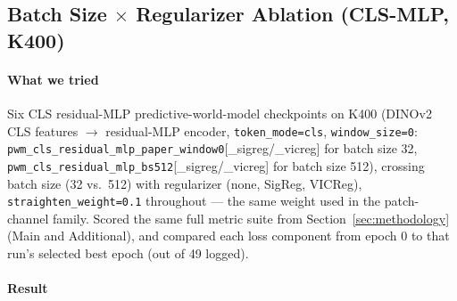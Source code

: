 \subsection{Batch Size $\times$ Regularizer Ablation (CLS-MLP, K400)}
\label{exp:bs-regularizer-clsmlp}

\paragraph{What we tried} Six CLS residual-MLP predictive-world-model checkpoints on
K400 (DINOv2 CLS features $\to$ residual-MLP encoder, \texttt{token\_mode=cls},
\texttt{window\_size=0}: \texttt{pwm\_cls\_residual\_mlp\_paper\_window0}[\_sigreg/\_vicreg]
for batch size 32, \texttt{pwm\_cls\_residual\_mlp\_bs512}[\_sigreg/\_vicreg] for batch
size 512), crossing batch size (32 vs.\ 512) with regularizer (none, SigReg, VICReg),
\texttt{straighten\_weight=0.1} throughout --- the same weight used in the
patch-channel family. Scored the same full metric suite from
Section~\ref{sec:methodology} (Main and Additional), and compared each loss component
from epoch 0 to that run's selected best epoch (out of 49 logged).

\paragraph{Result}

